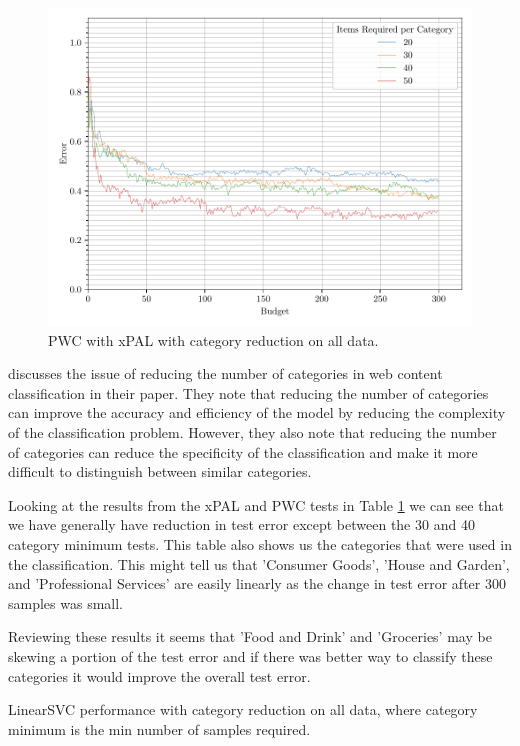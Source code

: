 \begin{figure}[ht]
    \centering
    \includegraphics[width=\scale\textwidth]{../img/plot_text_data_all_category_reduction_test_results.pdf}
    \caption{PWC with xPAL with category reduction on all data.}
    \label{fig:all_data_category_reduction_xpal}
\end{figure}

\cite{dumais2000hierarchical} discusses the issue of reducing the number of categories in web content classification in their paper. They note that reducing the number of categories can improve the accuracy and efficiency of the model by reducing the complexity of the classification problem. However, they also note that reducing the number of categories can reduce the specificity of the classification and make it more difficult to distinguish between similar categories.

Looking at the results from the xPAL and PWC tests in Table \ref{fig:all_data_category_reduction_xpal} we can see that we have generally have reduction in test error except between the 30 and 40 category minimum tests. This table also shows us the categories that were used in the classification. This might tell us that 'Consumer Goods', 'House and Garden', and 'Professional Services' are easily linearly as the change in test error after 300 samples was small.

Reviewing these results it seems that 'Food and Drink' and 'Groceries' may be skewing a portion of the test error and if there was better way to classify these categories it would improve the overall test error.

\begin{table}[ht]
     \centering  
     \caption{LinearSVC performance with category reduction on all data, where category minimum is the min number of samples required.}
     
     \label{tab:lscv_all_data_category_reduction} 
\end{table}

